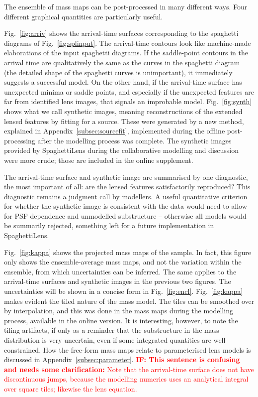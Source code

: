 The ensemble of mass maps can be post-processed in many different
ways.  Four different graphical quantities are particularly useful.

Fig.~\ref{fig:arriv} shows the arrival-time surfaces corresponding to
the spaghetti diagrams of Fig.~\ref{fig:splinput}.  The arrival-time
contours look like machine-made elaborations of the input spaghetti
diagrams.  If the saddle-point contours in the arrival time are
qualitatively the same as the curves in the spaghetti diagram (the
detailed shape of the spaghetti curves is unimportant), it immediately
suggests a successful model.  On the other hand, if the arrival-time
surface has unexpected minima or saddle points, and especially if the
unexpected features are far from identified lens images, that signals
an improbable model.  Fig.~\ref{fig:synth} shows what we call synthetic
images, meaning reconstructions of the extended lensed features by
fitting for a source.  These were generated by a new method, explained
in Appendix~\ref{subsec:sourcefit}, implemented during the offline
post-processing after the modelling process was complete.  The
synthetic images provided by SpaghettiLens during the collaborative
modelling and discussion were more crude; those are included in the
online supplement.

The arrival-time surface and synthetic image are summarised by one
diagnostic, the most important of all: are the lensed features
satisfactorily reproduced?  This diagnostic remains a judgment call by
modellers.  A useful quantitative criterion for whether the synthetic
image is consistent with the data would need to allow for PSF
dependence and unmodelled substructure -- otherwise all models would
be summarily rejected, something left for a future implementation
in SpaghettiLens.


Fig.~\ref{fig:kappa} shows the projected mass maps of the sample.  In
fact, this figure only shows the ensemble-average mass maps, and not
the variation within the ensemble, from which uncertainties can be
inferred. The same applies to the arrival-time surfaces and synthetic
images in the previous two figures. The uncertainties will be shown in
a concise form in Fig.~\ref{fig:encl}.  Fig.~\ref{fig:kappa} makes
evident the tiled nature of the mass model.  The tiles can be smoothed
over by interpolation, and this was done in the mass maps during the
modelling process, available in the online version.  It is
interesting, however, to note the tiling artifacts, if only as a
reminder that the substructure in the mass distribution is very
uncertain, even if some integrated quantities are  well
constrained.  How the free-form mass maps relate to parameterised lens
models is discussed in Appendix~\ref{subsec:parameter}.
\textcolor{red}{{\bf IF: This sentence is confusing and needs some
    clarification:} Note that the arrival-time surface does not have
  discontinuous jumps, because the modelling numerics uses an
  analytical integral over square tiles; likewise the lens equation.}

